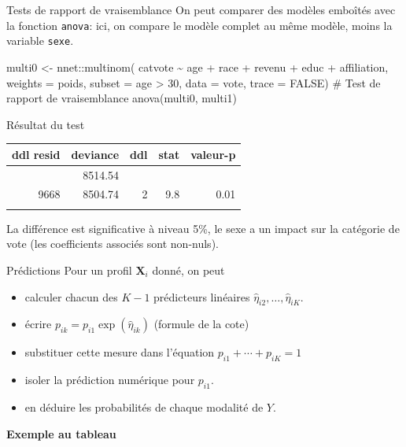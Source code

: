 \documentclass[
  ignorenonframetext,
]{beamer}
\newenvironment{Shaded}{\begin{snugshade}}{\end{snugshade}}
\newcommand{\AttributeTok}[1]{\textcolor[rgb]{0.40,0.45,0.13}{#1}}
\newcommand{\CommentTok}[1]{\textcolor[rgb]{0.37,0.37,0.37}{#1}}
\newcommand{\ConstantTok}[1]{\textcolor[rgb]{0.56,0.35,0.01}{#1}}
\newcommand{\DecValTok}[1]{\textcolor[rgb]{0.68,0.00,0.00}{#1}}
\newcommand{\FunctionTok}[1]{\textcolor[rgb]{0.28,0.35,0.67}{#1}}
\newcommand{\NormalTok}[1]{\textcolor[rgb]{0.00,0.23,0.31}{#1}}
\newcommand{\OtherTok}[1]{\textcolor[rgb]{0.00,0.23,0.31}{#1}}
\newcommand{\SpecialCharTok}[1]{\textcolor[rgb]{0.37,0.37,0.37}{#1}}
\providecommand{\tightlist}{%
  \setlength{\itemsep}{0pt}\setlength{\parskip}{0pt}}\usepackage{longtable,booktabs,array}
\begin{document}
\begin{frame}[fragile]{Tests de rapport de vraisemblance}
\label{tests-de-rapport-de-vraisemblance}
On peut comparer des modèles emboîtés avec la fonction \texttt{anova}:
ici, on compare le modèle complet au même modèle, moins la variable
\texttt{sexe}.

\begin{Shaded}
\begin{Highlighting}[numbers=left,,]
\NormalTok{multi0 }\OtherTok{\textless{}{-}}\NormalTok{ nnet}\SpecialCharTok{::}\FunctionTok{multinom}\NormalTok{(}
\NormalTok{  catvote }\SpecialCharTok{\textasciitilde{}}\NormalTok{ age }\SpecialCharTok{+}\NormalTok{ race }\SpecialCharTok{+}\NormalTok{ revenu }\SpecialCharTok{+}\NormalTok{ educ }\SpecialCharTok{+}\NormalTok{ affiliation,}
  \AttributeTok{weights =}\NormalTok{ poids,}
  \AttributeTok{subset =}\NormalTok{ age }\SpecialCharTok{\textgreater{}} \DecValTok{30}\NormalTok{,}
  \AttributeTok{data =}\NormalTok{ vote,}
  \AttributeTok{trace =} \ConstantTok{FALSE}\NormalTok{)}
\CommentTok{\# Test de rapport de vraisemblance}
\FunctionTok{anova}\NormalTok{(multi0, multi1)}
\end{Highlighting}
\end{Shaded}
\end{frame}

\begin{frame}{Résultat du test}
\label{ruxe9sultat-du-test}
\begin{longtable}[]{@{}rrrrr@{}}
\toprule\noalign{}
ddl resid & deviance & ddl & stat & valeur-p \\
\midrule\noalign{}
\endhead
9670 & 8514.54 & & & \\
9668 & 8504.74 & 2 & 9.8 & 0.01 \\
\bottomrule\noalign{}
\end{longtable}

La différence est significative à niveau 5\%, le sexe a un impact sur la
catégorie de vote (les coefficients associés sont non-nuls).
\end{frame}

\begin{frame}{Prédictions}
\label{pruxe9dictions}
Pour un profil \(\mathbf{X}_i\) donné, on peut

\begin{itemize}
\tightlist
\item
  calculer chacun des \(K-1\) prédicteurs linéaires
  \(\widehat{\eta}_{i2}, \ldots, \widehat{\eta}_{iK}\).
\item
  écrire \(p_{ik} = p_{i1}\exp(\widehat{\eta}_{ik})\) (formule de la
  cote)
\item
  substituer cette mesure dans l'équation \(p_{i1} + \cdots + p_{iK}=1\)
\item
  isoler la prédiction numérique pour \(p_{i1}\).
\item
  en déduire les probabilités de chaque modalité de \(Y\).
\end{itemize}

\textbf{Exemple au tableau}
\end{frame}
\end{document}
